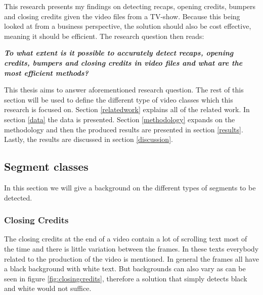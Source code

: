 \documentclass{article}
\begin{document}
This research presents my findings on detecting recaps, opening credits, bumpers and closing credits given the video files from a TV-show. Because this being looked at from a business perspective, the solution should also be cost effective, meaning it should be efficient. The research question then reads:
\newline
\begin{adjustwidth}{0.3in}{0.3in}
\textit{\textbf{To what extent is it possible to accurately detect recaps, opening credits, bumpers and closing credits in video files and what are the most efficient methods? \newline}}
\end{adjustwidth}
This thesis aims to answer aforementioned research question. The rest of this section will be used to define the different type of video classes which this research is focused on. Section \ref{relatedwork} explains all of the related work. In section \ref{data} the data is presented. Section \ref{methodology} expands on the methodology and then the produced results are presented in section \ref{results}. Lastly, the results are discussed in section \ref{discussion}.

\subsection{Segment classes}
In this section we will give a background on the different types of segments to be detected.

\subsubsection{Closing Credits}
The closing credits at the end of a video contain a lot of scrolling text most of the time and there is little variation between the frames. In these texts everybody related to the production of the video is mentioned. In general the frames all have a black background with white text. But backgrounds can also vary as can be seen in figure \ref{fig:closingcredits}, therefore a solution that simply detects black and white would not suffice.
\end{document}
